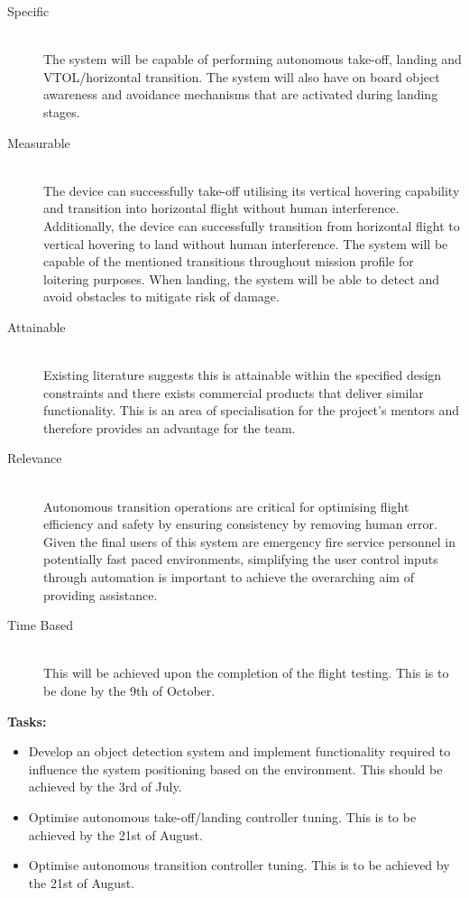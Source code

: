 \begin{appendices}
\begin{description}
    \item[Specific] \hfill \\
    The system will be capable of performing autonomous take-off, landing and VTOL/horizontal transition. The system will also have on board object awareness and avoidance mechanisms that are activated during landing stages.
    \item[Measurable] \hfill \\
    The device can successfully take-off utilising its vertical hovering capability and transition into horizontal flight without human interference. Additionally, the device can successfully transition from horizontal flight to vertical hovering to land without human interference. The system will be capable of the mentioned transitions throughout mission profile for loitering purposes. When landing, the system will be able to detect and avoid obstacles to mitigate risk of damage.
    \item[Attainable] \hfill \\
    Existing literature suggests this is attainable within the specified design constraints and there exists commercial products that deliver similar functionality. This is an area of specialisation for the project's mentors and therefore provides an advantage for the team.
    \item[Relevance] \hfill \\
    Autonomous transition operations are critical for optimising flight efficiency and safety by ensuring consistency by removing human error. Given the final users of this system are emergency fire service personnel in potentially fast paced environments, simplifying the user control inputs through automation is important to achieve the overarching aim of providing assistance.
    \item[Time Based] \hfill \\
    This will be achieved upon the completion of the flight testing. This is to be done by the 9th of October.
\end{description}

\textbf{Tasks:}
\begin{itemize}
    \item Develop an object detection system and implement functionality required to influence the system positioning based on the environment. This should be achieved by the 3rd of July.
    \item Optimise autonomous take-off/landing controller tuning. This is to be achieved by the 21st of August.
    \item Optimise autonomous transition controller tuning. This is to be achieved by the 21st of August.
\end{itemize}
\newpage

\end{appendices}
